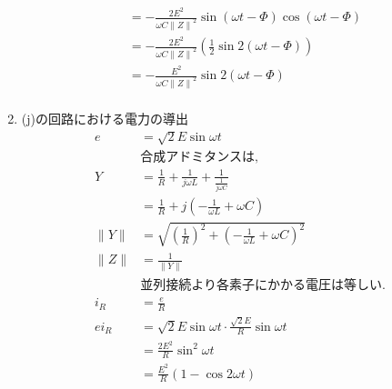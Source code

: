 \documentclass[twocolumn]{article}
\begin{document}
\begin{enumerate}
\begin{align*}
                          & = -\frac{2E^2}{\omega C {\|Z\|}^2}\sin\left(\omega t - \Phi\right) \cos \left(\omega t - \Phi\right)                                \\
                          & = -\frac{2E^2}{\omega C {\|Z\|}^2} \left(\frac{1}{2} \sin2\left(\omega t - \Phi\right)\right)                                       \\
                          & = -\frac{E^2}{\omega C {\|Z\|}^2}\sin2\left(\omega t -\Phi\right)                                                                   \\
        \end{align*}


  \item (j)の回路における電力の導出
        \begin{align*}
          e               & = \sqrt{2}E\sin\omega t                                                                 \\
                          & \text{合成アドミタンスは,}                                                                       \\
          Y               & = \frac{1}{R} + \frac{1}{j\omega L} + \frac{1}{\frac{1}{j\omega C}}                     \\
                          & = \frac{1}{R} + j\left(-\frac{1}{\omega L} + \omega C\right)                            \\
          \|Y\|           & = \sqrt{{\left(\frac{1}{R}\right)}^2 + {\left(-\frac{1}{\omega L} + \omega C\right)}^2} \\
          \|Z\|           & = \frac{1}{\|Y\|}                                                                       \\
                          & \text{並列接続より各素子にかかる電圧は等しい.}                                                             \\
          i_R             & = \frac{e}{R}                                                                           \\
          ei_R            & = \sqrt{2}E\sin\omega t \cdot \frac{\sqrt{2}E}{R}\sin\omega t                           \\
                          & = \frac{2E^2}{R}\sin^2 \omega t                                                         \\
                          & = \frac{E^2}{R}\left(1 - \cos 2 \omega t\right)                                         \\

\end{align*}
\end{enumerate}
\end{document}

